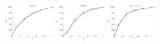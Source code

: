 \documentclass[a4paper]{report}
\newcommand{\wratio}{0.16}
\begin{document}
\includegraphics[width=\wratio\textwidth]{influence/CAIDA/fs_caida}\hfill
\includegraphics[width=\wratio\textwidth]{influence/CORA/fs_cora}\hfill
\includegraphics[width=\wratio\textwidth]{influence/DBLP_CITE/fs_dblp_cite}\hfill
\end{document}
